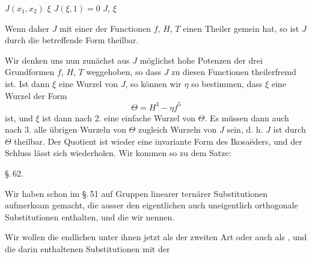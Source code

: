 
 $J(x_1, x_2)$  $\xi$  $J(\xi, 1) = 0$  $J$,  $\xi$ 

Wenn daher $J$ mit einer der Functionen $f$, $H$, $T$ einen Theiler gemein hat, so ist $J$ durch die betreffende Form theilbar.

Wir denken uns nun zun\"achst aus $J$ m\"oglichst hohe Potenzen der drei Grundformen $f$, $H$, $T$ weggehoben, so dass $J$ zu diesen Functionen theilerfremd ist. Ist dann $\xi$ eine Wurzel von $J$, so k\"onnen wir $\eta$ so bestimmen, dass $\xi$ eine Wurzel der Form
\[
\Theta = H^3 - \eta f^5
\]
ist, und $\xi$ ist dann nach 2. eine einfache Wurzel von $\Theta$. Es m\"ussen dann auch nach 3. alle \"ubrigen Wurzeln von $\Theta$ zugleich Wurzeln von $J$ sein, d. h. $J$ ist durch $\Theta$ theilbar. Der Quotient ist wieder eine invariante Form des Ikosa\"eders, und der Schluss l\"asst sich wiederholen. Wir kommen so zu dem Satze:


\begin{center}
\S.\,62.\\
\end{center}

Wir haben schon im \S.\,51 auf Gruppen linearer tern\"arer Substitutionen aufmerksam gemacht, die ausser den eigentlichen auch uneigentlich orthogonale Substitutionen enthalten, und die wir  nennen.

Wir wollen die endlichen unter ihnen jetzt als  der zweiten Art oder auch als , und die darin enthaltenen Substitutionen mit der

